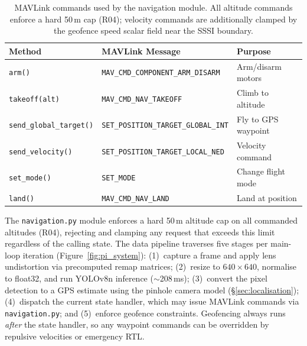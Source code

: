 \begin{table}[ht]
\centering\small
\begin{tabular}{lll}
\toprule
\textbf{Method} & \textbf{MAVLink Message} & \textbf{Purpose} \\
\midrule
\texttt{arm()} & \texttt{MAV\_CMD\_COMPONENT\_ARM\_DISARM} & Arm/disarm motors \\
\texttt{takeoff(alt)} & \texttt{MAV\_CMD\_NAV\_TAKEOFF} & Climb to altitude \\
\texttt{send\_global\_target()} & \texttt{SET\_POSITION\_TARGET\_GLOBAL\_INT} & Fly to GPS waypoint \\
\texttt{send\_velocity()} & \texttt{SET\_POSITION\_TARGET\_LOCAL\_NED} & Velocity command \\
\texttt{set\_mode()} & \texttt{SET\_MODE} & Change flight mode \\
\texttt{land()} & \texttt{MAV\_CMD\_NAV\_LAND} & Land at position \\
\bottomrule
\end{tabular}
\caption{MAVLink commands used by the navigation module.  All altitude commands enforce a hard 50\,m cap (R04); velocity commands are additionally clamped by the geofence speed scalar field near the SSSI boundary.}
\label{tab:mavlink-commands}
\end{table}

The \texttt{navigation.py} module enforces a hard 50\,m altitude cap on all commanded altitudes (R04), rejecting and clamping any request that exceeds this limit regardless of the calling state. The data pipeline traverses five stages per main-loop iteration (Figure~\ref{fig:pi_system}): (1)~capture a frame and apply lens undistortion via precomputed remap matrices; (2)~resize to $640\times640$, normalise to float32, and run YOLOv8n inference (${\sim}$208\,ms); (3)~convert the pixel detection to a GPS estimate using the pinhole camera model (\S\ref{sec:localisation}); (4)~dispatch the current state handler, which may issue MAVLink commands via \texttt{navigation.py}; and (5)~enforce geofence constraints. Geofencing always runs \emph{after} the state handler, so any waypoint commands can be overridden by repulsive velocities or emergency RTL.

